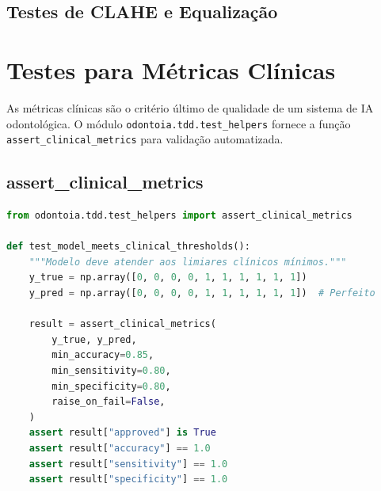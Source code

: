 \subsection{Testes de CLAHE e Equalização}



\section{Testes para Métricas Clínicas}

As métricas clínicas são o critério último de qualidade de um sistema
de IA odontológica. O módulo \texttt{odontoia.tdd.test\_helpers} fornece
a função \texttt{assert\_clinical\_metrics} para validação automatizada.

\subsection{assert\_clinical\_metrics}

\begin{lstlisting}[language=Python, caption={Uso de assert\_clinical\_metrics em TDD}]
from odontoia.tdd.test_helpers import assert_clinical_metrics

def test_model_meets_clinical_thresholds():
    """Modelo deve atender aos limiares clínicos mínimos."""
    y_true = np.array([0, 0, 0, 0, 1, 1, 1, 1, 1, 1])
    y_pred = np.array([0, 0, 0, 0, 1, 1, 1, 1, 1, 1])  # Perfeito

    result = assert_clinical_metrics(
        y_true, y_pred,
        min_accuracy=0.85,
        min_sensitivity=0.80,
        min_specificity=0.80,
        raise_on_fail=False,
    )
    assert result["approved"] is True
    assert result["accuracy"] == 1.0
    assert result["sensitivity"] == 1.0
    assert result["specificity"] == 1.0
\end{lstlisting}



